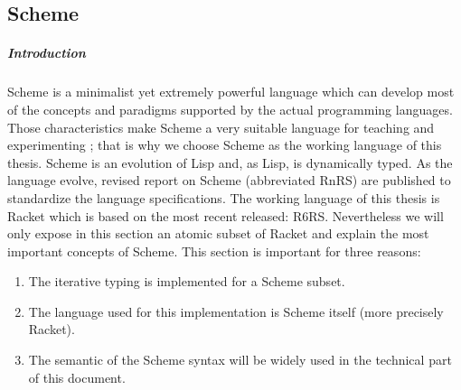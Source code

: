\documentclass[a4paper]{report}
\begin{document}
\begin{appendices}

\chapter{Scheme\label{an_scheme}}

\paragraph{Introduction} Scheme is a minimalist yet extremely powerful language which can develop most of the concepts and paradigms supported by the actual programming languages. Those characteristics make Scheme a very suitable language for teaching and experimenting ; that is why we choose Scheme as the working language of this thesis. Scheme is an evolution of Lisp and, as Lisp, is dynamically typed. As the language evolve, revised report on Scheme (abbreviated RnRS) are published to standardize the language specifications. The working language of this thesis is Racket which is based on the most recent released: R6RS. Nevertheless we will only expose in this section an atomic subset of Racket and explain the most important concepts of Scheme. This section is important for three reasons:
\begin{enumerate}
\item The iterative typing is implemented for a Scheme subset.
\item The language used for this implementation is Scheme itself (more precisely Racket).
\item The semantic of the Scheme syntax will be widely used in the technical part of this document. 
\end{enumerate}


\end{appendices}
\end{document}
